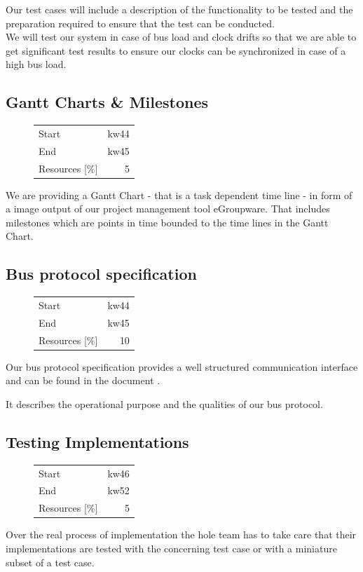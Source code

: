 Our test cases will include a description of the functionality to be tested and the preparation required
to ensure that the test can be conducted.\\
We will test our system in case of bus load and clock drifts so that we are able to get
significant test results to ensure our clocks can be synchronized in case of a high bus load.

\subsection{Gantt Charts \& Milestones}
\begin{figure}
\begin{tabular}[t]{|lr|}
\hline
Start & kw44\\
End & kw45\\
Resources [\%] & 5\\
\hline
\end{tabular}
\end{figure}
We are providing a Gantt Chart - that is a task dependent time line - in form of a image output of our 
project management tool eGroupware. That includes milestones which are points 
in time bounded to the time lines in the Gantt Chart.
\subsection{Bus protocol specification}
\begin{figure}
\begin{tabular}[t]{|lr|}
\hline
Start & kw44\\
End & kw45\\
Resources [\%] & 10\\
\hline
\end{tabular}
\end{figure}
Our bus protocol specification provides a well structured communication interface and can be found in the document \cite [NESD2]{NESD2}.

It describes the operational purpose and the qualities of our bus protocol.
\subsection{Testing Implementations}
\begin{figure}
\begin{tabular}[t]{|lr|}
\hline
Start & kw46\\
End & kw52\\
Resources [\%] & 5\\
\hline
\end{tabular}
\end{figure}
Over the real process of implementation the hole team has to take care that their 
implementations are tested with the concerning test case or with a miniature subset of a test case.\\

